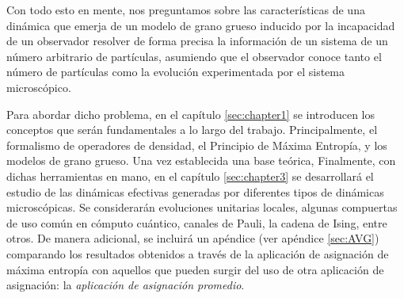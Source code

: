 
Con todo esto en mente, nos preguntamos sobre las características de una dinámica que emerja de un modelo de grano grueso inducido por la incapacidad de un observador  resolver de forma precisa la información de un sistema de un número arbitrario de partículas, asumiendo que el observador conoce tanto el número de partículas como la evolución experimentada por el sistema microscópico.


Para abordar dicho problema, en el capítulo \ref{sec:chapter1} se introducen los conceptos que serán fundamentales a lo largo del trabajo. Principalmente, el formalismo de operadores de densidad, el Principio de Máxima Entropía, y los modelos de grano grueso. Una vez establecida una base teórica,  Finalmente, con dichas herramientas en mano, en el capítulo \ref{sec:chapter3} se desarrollará el estudio de las dinámicas efectivas generadas por diferentes tipos de dinámicas microscópicas. Se considerarán evoluciones unitarias locales, algunas compuertas de uso común en cómputo cuántico, canales de Pauli, la cadena de Ising, entre otros. De manera adicional, se incluirá un apéndice (ver apéndice \ref{sec:AVG}) comparando los resultados obtenidos a través de la aplicación de asignación de máxima entropía con aquellos que pueden surgir del uso de otra aplicación de asignación: la \textit{aplicación de asignación promedio}.